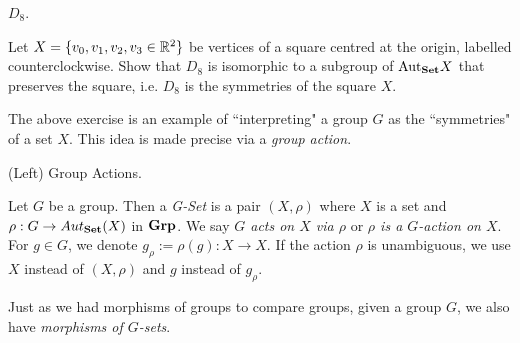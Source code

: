 \documentclass[../../book.tex]{subfiles}
\begin{document}
\begin{ex} $D_8$.
    
    Let $X = \{v_0, v_1, v_2, v_3 \in \mathbb{R}^2\}$ be 
    vertices of a square centred at the origin, labelled counterclockwise. 
    Show that $D_8$ is isomorphic to a subgroup of $\mathrm{Aut}_{\mathbf{Set}}X$
    that preserves the square,
    i.e. $D_8$ is the symmetries of the square $X$.
    
    
\end{ex}

\begin{rmk}
    The above exercise is an example
    of ``interpreting" a group $G$ as the ``symmetries" of a set $X$. 
    This idea is made precise via a \emph{group action}. 
\end{rmk}

\begin{dfn} (Left) Group Actions. 

    Let $G$ be a group. 
    Then a \emph{G-Set} is a pair $(X, \rho)$ where 
    $X$ is a set and $\rho : G \to Aut_{\mathbf{Set}}(X)$ in $\mathbf{Grp}$.
    We say \emph{$G$ acts on $X$ via $\rho$} or 
    \emph{$\rho$ is a $G$-action on $X$}. 
    For $g \in G$, we denote $g_\rho := \rho(g) : X \to X$. 
    If the action $\rho$ is unambiguous, we use $X$ instead of $(X,\rho)$
    and $g$ instead of $g_\rho$.
    
\end{dfn}

Just as we had morphisms of groups to compare groups, 
given a group $G$, we also have \emph{morphisms of $G$-sets}. 
\end{document}
